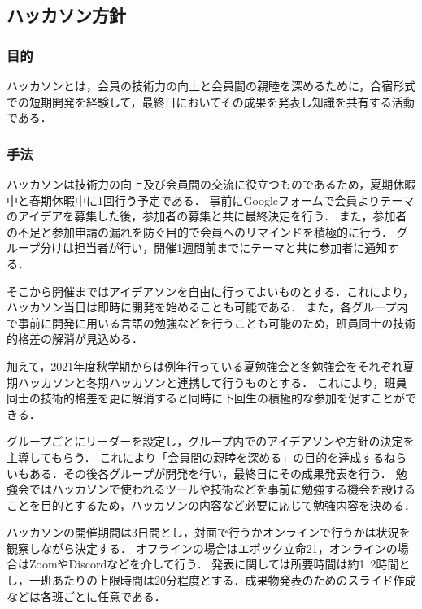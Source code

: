 \subsection*{ハッカソン方針}


\subsubsection*{目的}
ハッカソンとは，会員の技術力の向上と会員間の親睦を深めるために，合宿形式での短期開発を経験して，最終日においてその成果を発表し知識を共有する活動である．


\subsubsection*{手法}
ハッカソンは技術力の向上及び会員間の交流に役立つものであるため，夏期休暇中と春期休暇中に1回行う予定である．
事前にGoogleフォームで会員よりテーマのアイデアを募集した後，参加者の募集と共に最終決定を行う．
また，参加者の不足と参加申請の漏れを防ぐ目的で会員へのリマインドを積極的に行う．
グループ分けは担当者が行い，開催1週間前までにテーマと共に参加者に通知する．

そこから開催まではアイデアソンを自由に行ってよいものとする．これにより，ハッカソン当日は即時に開発を始めることも可能である．
また，各グループ内で事前に開発に用いる言語の勉強などを行うことも可能のため，班員同士の技術的格差の解消が見込める．

加えて，2021年度秋学期からは例年行っている夏勉強会と冬勉強会をそれぞれ夏期ハッカソンと冬期ハッカソンと連携して行うものとする．
これにより，班員同士の技術的格差を更に解消すると同時に下回生の積極的な参加を促すことができる．

グループごとにリーダーを設定し，グループ内でのアイデアソンや方針の決定を主導してもらう．
これにより「会員間の親睦を深める」の目的を達成するねらいもある．その後各グループが開発を行い，最終日にその成果発表を行う．
勉強会ではハッカソンで使われるツールや技術などを事前に勉強する機会を設けることを目的とするため，ハッカソンの内容など必要に応じて勉強内容を決める．

ハッカソンの開催期間は3日間とし，対面で行うかオンラインで行うかは状況を観察しながら決定する．
オフラインの場合はエポック立命21，オンラインの場合はZoomやDiscordなどを介して行う．
発表に関しては所要時間は約1~2時間とし，一班あたりの上限時間は20分程度とする．成果物発表のためのスライド作成などは各班ごとに任意である．

